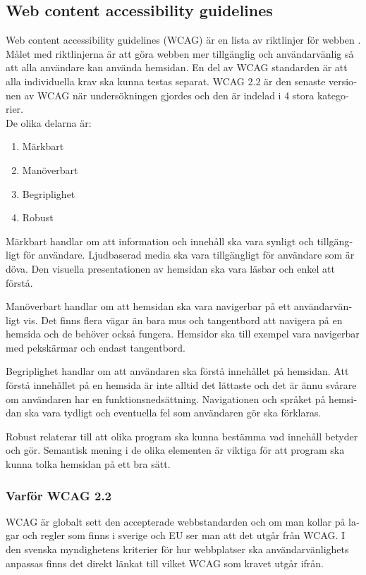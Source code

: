 \documentclass[11p]{article}
\begin{document}
\begin{otherlanguage}{swedish}
    \subsection{Web content accessibility guidelines}
    Web content accessibility guidelines (WCAG) är en lista av riktlinjer för webben \parencite{WCAG_2.2}.
    Målet med riktlinjerna är att göra webben mer tillgänglig och användarvänlig så att alla användare kan använda hemsidan.
    En del av WCAG standarden är att alla individuella krav ska kunna testas separat.
    WCAG 2.2 är den senaste versionen av WCAG när undersökningen gjordes och den är indelad i 4 stora kategorier.
    \\De olika delarna är:
    \begin{enumerate}
        \item Märkbart
        \item Manöverbart
        \item Begriplighet
        \item Robust
    \end{enumerate}

    Märkbart handlar om att information och innehåll ska vara synligt och tillgängligt för användare.
    Ljudbaserad media ska vara tillgängligt för användare som är döva.
    Den visuella presentationen av hemsidan ska vara läsbar och enkel att förstå.

    Manöverbart handlar om att hemsidan ska vara navigerbar på ett användarvänligt vis.
    Det finns flera vägar än bara mus och tangentbord att navigera på en hemsida och de behöver också fungera.
    Hemsidor ska till exempel vara navigerbar med pekskärmar och endast tangentbord.

    Begriplighet handlar om att användaren ska förstå innehållet på hemsidan.
    Att förstå innehållet på en hemsida är inte alltid det lättaste och det är ännu svårare om användaren har en funktionsnedsättning.
    Navigationen och språket på hemsidan ska vara tydligt och eventuella fel som användaren gör ska förklaras.

    Robust relaterar till att olika program ska kunna bestämma vad innehåll betyder och gör.
    Semantisk mening i de olika elementen är viktiga för att program ska kunna tolka hemsidan på ett bra sätt.

    \subsubsection{Varför WCAG 2.2}
    WCAG är globalt sett den accepterade webbstandarden och om man kollar på lagar och regler som finns i sverige och EU ser man att det utgår från WCAG.
    I den svenska myndighetens kriterier för hur webbplatser ska användarvänlighets anpassas finns det direkt länkat till vilket WCAG som kravet utgår ifrån. \parencite{Utförande_av_Dos_lagen}



\end{otherlanguage}
\end{document}
